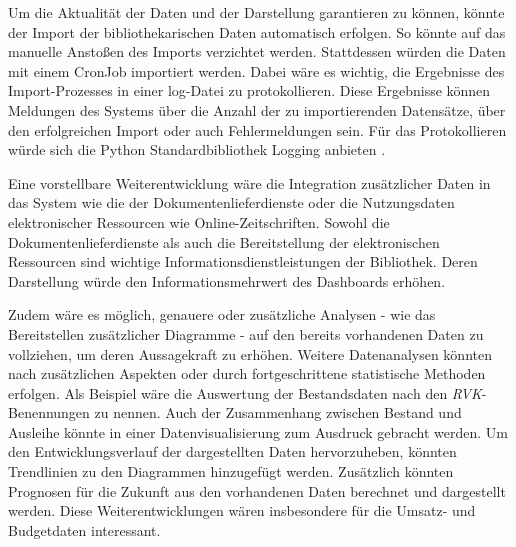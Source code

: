 Um die Aktualität der Daten und der Darstellung garantieren zu können, könnte der Import der bibliothekarischen Daten automatisch erfolgen. So könnte auf das manuelle
Anstoßen des Imports verzichtet werden. Stattdessen würden die Daten mit einem CronJob importiert werden. Dabei wäre es wichtig, die Ergebnisse des Import-Prozesses in einer log-Datei zu protokollieren. 
Diese Ergebnisse können Meldungen des Systems über die Anzahl der zu importierenden Datensätze, über den erfolgreichen Import oder auch Fehlermeldungen sein.
Für das Protokollieren würde sich die Python Standardbibliothek Logging anbieten \cite[vgl.][]{sajip_logging_2021}.

Eine vorstellbare Weiterentwicklung wäre die Integration zusätzlicher Daten in das System wie die der Dokumentenlieferdienste oder die Nutzungsdaten elektronischer Ressourcen wie Online-Zeitschriften. 
Sowohl die Dokumentenlieferdienste als auch die Bereitstellung der elektronischen Ressourcen sind wichtige Informationsdienstleistungen der Bibliothek. 
Deren Darstellung würde den Informationsmehrwert des Dashboards erhöhen.


Zudem wäre es möglich, genauere oder zusätzliche Analysen - wie das Bereitstellen zusätzlicher Diagramme - auf den bereits vorhandenen Daten zu vollziehen, um deren Aussagekraft zu erhöhen.
Weitere Datenanalysen könnten nach zusätzlichen Aspekten oder durch fortgeschrittene statistische Methoden erfolgen. Als Beispiel wäre die Auswertung der Bestandsdaten nach den \textit{\acrshort{RVK}}-Benennungen
zu nennen. Auch der Zusammenhang zwischen Bestand und Ausleihe könnte in einer Datenvisualisierung zum Ausdruck gebracht werden.
Um den Entwicklungsverlauf der dargestellten Daten hervorzuheben, könnten Trendlinien zu den Diagrammen hinzugefügt werden. Zusätzlich könnten Prognosen
für die Zukunft aus den vorhandenen Daten berechnet und dargestellt werden. Diese Weiterentwicklungen wären insbesondere für die Umsatz- und Budgetdaten interessant.




